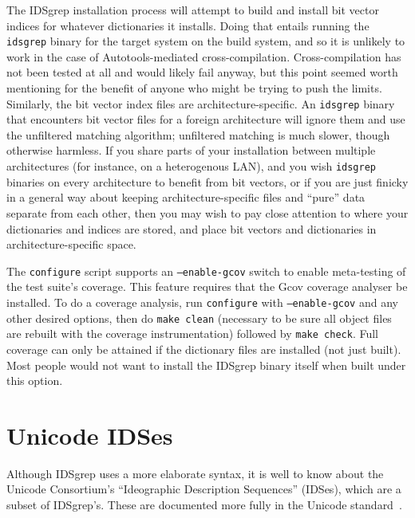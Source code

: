 \documentclass[twocolumn]{report}
\newcommand{\DangerousBend}{\marginpar{\large\hfill\dbend\hfill\null}}
\begin{document}
The \DangerousBend IDSgrep installation process will attempt to build and
install bit vector indices for whatever dictionaries it installs.  Doing
that entails running the \texttt{idsgrep} binary for the target system on
the build system, and so it is unlikely to work in the case of
Autotools-mediated cross-compilation.  Cross-compilation has not been tested
at all and would likely fail anyway, but this point seemed worth mentioning
for the benefit of anyone who might be trying to push the limits. 
Similarly, the bit vector index files are architecture-specific.  An
\texttt{idsgrep} binary that encounters bit vector files for a foreign
architecture will ignore them and use the unfiltered matching algorithm;
unfiltered matching is much slower, though otherwise harmless.  If you share
parts of your installation between multiple architectures (for instance, on
a heterogenous LAN), and you wish \texttt{idsgrep} binaries on every
architecture to benefit from bit vectors, or if you are just finicky in a
general way about keeping architecture-specific files and ``pure'' data
separate from each other, then you may wish to pay close attention to where
your dictionaries and indices are stored, and place bit vectors and
dictionaries in architecture-specific space.

The \DangerousBend\texttt{configure} script supports an
\texttt{--enable-gcov} switch to enable meta-testing of the test suite's
coverage.  This feature requires that the Gcov coverage analyser be
installed.  To do a coverage analysis, run \texttt{configure} with
\texttt{--enable-gcov} and any other desired options, then do \texttt{make
clean} (necessary to be sure all object files are rebuilt with the coverage
instrumentation) followed by \texttt{make check}.  Full coverage can only be
attained if the dictionary files are installed (not just built).  Most
people would not want to install the IDSgrep binary itself when built under
this option.


\section{Unicode IDSes}

Although IDSgrep uses a more elaborate syntax, it is well to know
about the Unicode Consortium's ``Ideographic Description Sequences''
(IDSes), which are a subset of IDSgrep's.  These are documented
more fully in the Unicode standard~\cite{Unicode:IDS}.
\end{document}
